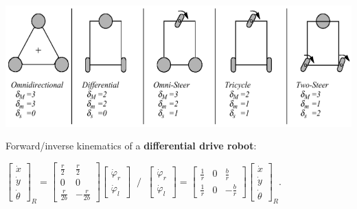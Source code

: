 \documentclass[landscape]{article}
\newcommand{\vmspace}{\vspace{-7pt}}
\newcommand{\vpspace}{\vspace{5pt}}
\begin{document}
\begin{multicols}{3}
\vpspace

\begin{minipage}{\columnwidth}
  \includegraphics[width=\columnwidth]{img/3_WheelTypes.png}
\end{minipage}

\begin{minipage}{\columnwidth}
  Forward/inverse kinematics of a \textbf{differential drive robot}:
  \vmspace
  \begin{center}
    $
    \left[
    \begin{matrix}
      \dot x \\
      \dot y \\
      \dot \theta
    \end{matrix}
    \right]_R
    =
    \left[
    \begin{matrix}
      \frac{r}{2} & \frac{r}{2} \\
      0 & 0 \\
      \frac{r}{2b} & -\frac{r}{2b}
    \end{matrix}
    \right]
    \left[
    \begin{matrix}
      \dot \varphi_r \\
      \dot \varphi_l
    \end{matrix}
    \right]
    \;\; / \;\;
    \left[
    \begin{matrix}
      \dot \varphi_r \\
      \dot \varphi_l
    \end{matrix}
    \right]
    =
    \left[
    \begin{matrix}
      \frac{1}{r} & 0 & \frac{b}{r} \\
      \frac{1}{r} & 0 & -\frac{b}{r}
    \end{matrix}
    \right]
    \left[
    \begin{matrix}
      \dot x \\
      \dot y \\
      \dot \theta
    \end{matrix}
    \right]_R
    $.
  \end{center}
\end{minipage}


\end{multicols}
\end{document}

